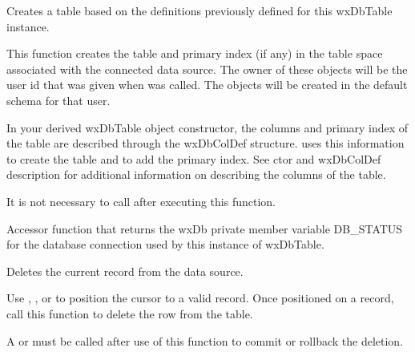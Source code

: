\label{wxdbtablecreatetable}


Creates a table based on the definitions previously defined for this
wxDbTable instance.




This function creates the table and primary index (if any) in the table space 
associated with the connected data source.  The owner of these objects will 
be the user id that was given when  was called.  The objects will 
be created in the default schema for that user.

In your derived wxDbTable object constructor, the columns and primary index 
of the table are described through the wxDbColDef structure.  
 uses this information to create the table and to add 
the primary index.  See  ctor and wxDbColDef 
description for additional information on describing the columns of the table.

It is not necessary to call  
after executing this function.


\label{wxdbtabledbstatus}


Accessor function that returns the wxDb private member variable DB_STATUS for 
the database connection used by this instance of wxDbTable.


\label{wxdbtabledelete}


Deletes the current record from the data source.


Use , , 
 or
 to position the cursor to 
a valid record.  Once positioned on a record, call this function to delete 
the row from the table.

A  or 
 must be called after use of 
this function to commit or rollback the deletion.

